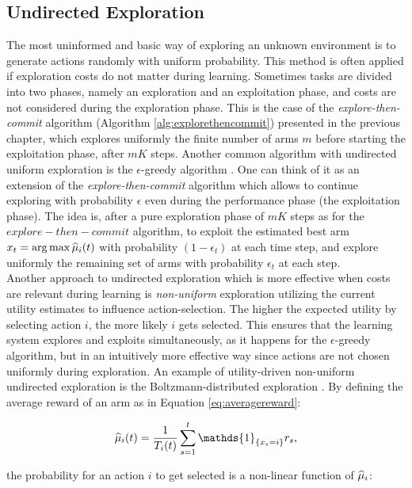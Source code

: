 \subsection{Undirected Exploration}
The most uninformed and basic way of exploring an unknown environment is to generate actions randomly with uniform probability. This method is often applied if exploration costs do not matter during learning. Sometimes tasks are divided into two phases, namely an exploration and an exploitation phase, and costs are not considered during the exploration phase. This is the case of the \emph{explore-then-commit} algorithm (Algorithm \ref{alg:explorethencommit}) presented in the previous chapter, which explores uniformly the finite number of arms $m$ before starting the exploitation phase, after $mK$ steps. Another common algorithm with undirected uniform exploration is the $\epsilon$-greedy algorithm \cite{lattimore2019bandit}. One can think of it as an extension of the \emph{explore-then-commit} algorithm which allows to continue exploring with probability $\epsilon$ even during the performance phase (\ie the exploitation phase). The idea is, after a pure exploration phase of $mK$ steps as for the $explore-then-commit$ algorithm, to exploit the estimated best arm $x_t = \arg \max \widehat{\mu}_i(t)$ with probability $(1-\epsilon_t)$ at each time step, and explore uniformly the remaining set of arms with probability $\epsilon_t$ at each step. \\
Another approach to undirected exploration which is more effective when costs are relevant during learning is \emph{non-uniform} exploration utilizing the current utility estimates to influence action-selection. The higher the expected utility by selecting action $i$, the more likely $i$ gets selected. This ensures that the learning system explores and exploits simultaneously, as it happens for the $\epsilon$-greedy algorithm, but in an intuitively more effective way since actions are not chosen uniformly during exploration. An example of utility-driven non-uniform undirected exploration is the  Boltzmann-distributed exploration \cite{cesa2017boltzmann}. By defining the average reward of an arm as in Equation \ref{eq:averagereward}:

\begin{equation}
\wh{\mu}_i(t) = \frac{1}{T_i(t)}\sum_{s=1}^{t}\mathds{1}_{\{x_s=i\}}r_s,
\end{equation}

the probability for an action $i$ to get selected is a non-linear function of $\widehat{\mu}_i$:

